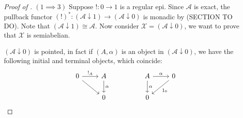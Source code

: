 \begin{subbox}{}
    \begin{proof}[\textit{Proof of }]\label{The proof}
        $(1\implies 3)$ Suppose $! : 0 \to 1$ is a regular epi. Since $\mathcal{A}$ is exact, the pullback functor $(!)^*: (\mathcal{A} \downarrow 1) \to (\mathcal{A} \downarrow 0)$ is monadic by (SECTION TO DO). Note that $(\mathcal{A} \downarrow 1) \cong \mathcal{A}$. Now consider $\mathcal{X} = (\mathcal{A} \downarrow 0)$, we want to prove that $\mathcal{X}$ is semiabelian. 
        
        $(\mathcal{A} \downarrow 0)$ is pointed, in fact if $(A,\alpha)$ is an object in $(\mathcal{A} \downarrow 0)$, we have the following initial and terminal objects, which coincide:
        \[
        \begin{tikzcd}
        0 \arrow[r, "!_A"] \arrow[rd] & A \arrow[d, "\alpha"] &  & A \arrow[r, "\alpha"] \arrow[d, "\alpha"] & 0 \arrow[ld, "1_0"] \\
                                      & 0                     &  & 0                                         &                    
        \end{tikzcd}
        \]


\end{proof}
\end{subbox}
